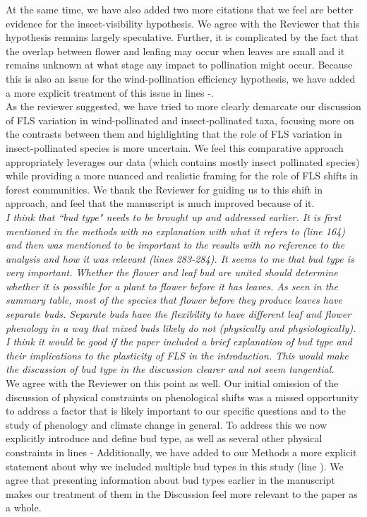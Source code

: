 \documentclass[11pt]{article}
\begin{document}
\noindent At the same time, we have also added two more citations that we feel are better evidence for the insect-visibility hypothesis. We agree with the Reviewer that this hypothesis remains largely speculative. Further, it is complicated by the fact that the overlap between flower and leafing may occur when leaves are small and it remains unknown at what stage any impact to pollination might occur. Because this is also an issue for the wind-pollination efficiency hypothesis, we have added a more explicit treatment of this issue in lines -.\\ 

\noindent As the reviewer suggested, we have tried to more clearly demarcate our discussion of FLS variation in wind-pollinated and insect-pollinated taxa, focusing more on the contrasts between them and highlighting that the role of FLS variation in insect-pollinated species is more uncertain. We feel this comparative approach appropriately leverages our data (which contains mostly insect pollinated species) while providing a more nuanced and realistic framing for the role of FLS shifts in forest communities. We thank the Reviewer for guiding us to this shift in approach, and feel that the manuscript is much improved because of it.\\

\emph{I think that ``bud type" needs to be brought up and addressed earlier. It is first mentioned in the methods with no explanation with what it refers to (line 164) and then was mentioned to be important to the results with no reference to the analysis and how it was relevant (lines 283-284). It seems to me that bud type is very important. Whether the flower and leaf bud are united should determine whether it is possible for a plant to flower before it has leaves.  As seen in the summary table, most of the species that flower before they produce leaves have separate buds. Separate buds have the flexibility to have different leaf and flower phenology in a way that mixed buds likely do not (physically and physiologically). I think it would be good if the paper included a brief explanation of bud type and their implications to the plasticity of FLS in the introduction. This would make the discussion of bud type in the discussion clearer and not seem tangential.}\\

\noindent We agree with the Reviewer on this point as well. Our initial omission of the discussion of physical constraints on phenological shifts was a missed opportunity to address a factor that is likely important to our specific questions and to the study of phenology and climate change in general. To address this we now explicitly introduce and define bud type, as well as several other physical constraints in lines - Additionally, we have added to our Methods a more explicit statement about why we included multiple bud types in this study (line ). We agree that presenting information about bud types earlier in the manuscript makes our treatment of them in the Discussion feel more relevant to the paper as a whole. \\
\end{document}
